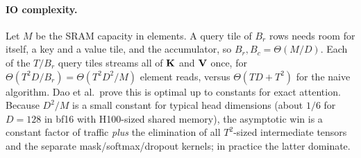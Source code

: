 \begin{figure}[t]
\centering\small
{}
\end{figure}

\paragraph{IO complexity.} Let $M$ be the SRAM capacity in elements. A query tile of $B_r$ rows needs
room for itself, a key and a value tile, and the accumulator, so $B_r,B_c=\Theta(M/D)$. Each of the
$T/B_r$ query tiles streams all of $\mathbf{K}$ and $\mathbf{V}$ once, for $\Theta(T^2D/B_r)=\Theta(T^2D^2/M)$
element reads, versus $\Theta(TD+T^2)$ for the naive algorithm. Dao et al.\ prove this is optimal up
to constants for exact attention. Because $D^2/M$ is a small constant for typical head dimensions
(about $1/6$ for $D=128$ in bf16 with H100-sized shared memory), the asymptotic win is a constant
factor of traffic \emph{plus} the elimination of all $T^2$-sized intermediate tensors and
the separate mask/softmax/dropout kernels; in practice the latter dominate.

